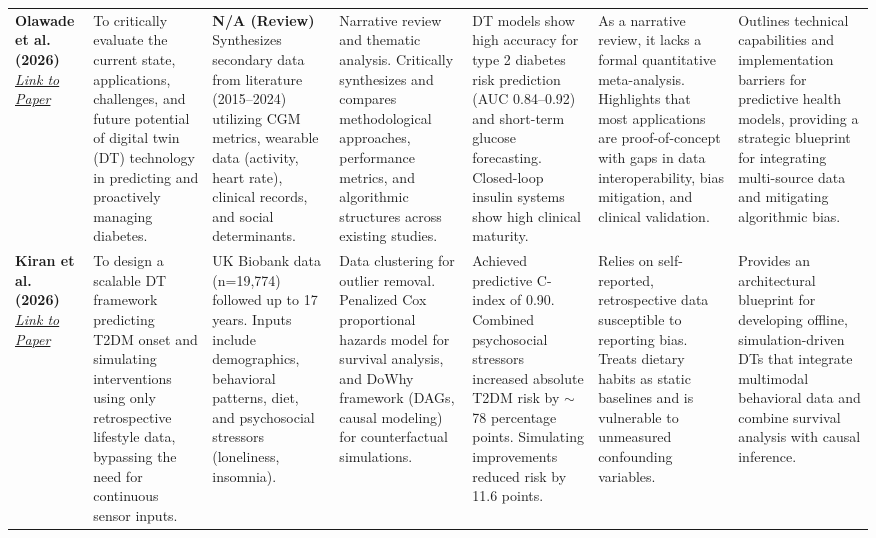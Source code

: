 \documentclass[12pt]{article}
\begin{document}
{\begin{xltabular}{\textwidth}{@{} >{\hsize}L *{6}{>{\hsize}L} @{}}
    \textbf{Olawade et al. (2026)}~\cite{olawade2026digital} \newline \href{https://www.scopus.com/pages/publications/105027272493?origin=resultslist}{\textcolor{linkblue}{\textit{Link to Paper}}} &
    To critically evaluate the current state, applications, challenges, and future potential of digital twin (DT) technology in predicting and proactively managing diabetes. &
    \textbf{N/A (Review)} \newline \newline Synthesizes secondary data from literature (2015--2024) utilizing CGM metrics, wearable data (activity, heart rate), clinical records, and social determinants. &
    Narrative review and thematic analysis. Critically synthesizes and compares methodological approaches, performance metrics, and algorithmic structures across existing studies. &
    DT models show high accuracy for type 2 diabetes risk prediction (AUC 0.84--0.92) and short-term glucose forecasting. Closed-loop insulin systems show high clinical maturity. &
    As a narrative review, it lacks a formal quantitative meta-analysis. Highlights that most applications are proof-of-concept with gaps in data interoperability, bias mitigation, and clinical validation. &
    Outlines technical capabilities and implementation barriers for predictive health models, providing a strategic blueprint for integrating multi-source data and mitigating algorithmic bias. \\

    \textbf{Kiran et al. (2026)}~\cite{kiran2026digital} \newline \href{https://www.scopus.com/pages/publications/105033121198?origin=resultslist}{\textcolor{linkblue}{\textit{Link to Paper}}} &
    To design a scalable DT framework predicting T2DM onset and simulating interventions using only retrospective lifestyle data, bypassing the need for continuous sensor inputs. &
    UK Biobank data (n=19,774) followed up to 17 years. \newline \newline Inputs include demographics, behavioral patterns, diet, and psychosocial stressors (loneliness, insomnia). &
    Data clustering for outlier removal. Penalized Cox proportional hazards model for survival analysis, and DoWhy framework (DAGs, causal modeling) for counterfactual simulations. &
    Achieved predictive C-index of 0.90. Combined psychosocial stressors increased absolute T2DM risk by $\sim$78 percentage points. Simulating improvements reduced risk by 11.6 points. &
    Relies on self-reported, retrospective data susceptible to reporting bias. Treats dietary habits as static baselines and is vulnerable to unmeasured confounding variables. &
    Provides an architectural blueprint for developing offline, simulation-driven DTs that integrate multimodal behavioral data and combine survival analysis with causal inference. \\
    

\end{xltabular}}
\end{document}
